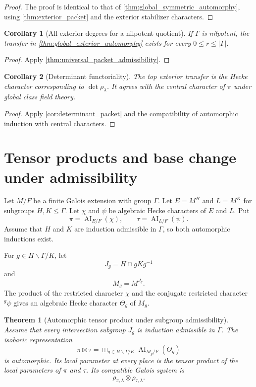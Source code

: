 \documentclass{aomart}
\newtheorem{theorem}{Theorem}[section]
\newtheorem{corollary}[corollary]{Corollary}
\theoremstyle{definition}
\theoremstyle{remark}
\newcommand{\AI}{\operatorname{AI}}
\newcommand{\abs}[1]{\left\lvert#1\right\rvert}
\newcommand{\boxplusop}{\mathbin{\boxplus}}
\begin{document}
\begin{proof}
The proof is identical to that of \cref{thm:global_symmetric_automorphy}, using \cref{thm:exterior_packet} and the exterior stabilizer characters.
\end{proof}

\begin{corollary}[All exterior degrees for a nilpotent quotient]\label{cor:nilpotent_all_exterior}
If \(\Gamma\) is nilpotent, the transfer in \cref{thm:global_exterior_automorphy} exists for every \(0\leq r\leq\abs\Gamma\).
\end{corollary}

\begin{proof}
Apply \cref{thm:universal_packet_admissibility}.
\end{proof}

\begin{corollary}[Determinant functoriality]\label{cor:global_determinant}
The top exterior transfer is the Hecke character corresponding to \(\det\rho_\lambda\). It agrees with the central character of \(\pi\) under global class field theory.
\end{corollary}

\begin{proof}
Apply \cref{cor:determinant_packet} and the compatibility of automorphic induction with central characters.
\end{proof}

\section{Tensor products and base change under admissibility}\label{sec:global_tensor}

Let \(M/F\) be a finite Galois extension with group \(\Gamma\). Let \(E=M^H\) and \(L=M^K\) for subgroups \(H,K\leq\Gamma\). Let \(\chi\) and \(\psi\) be algebraic Hecke characters of \(E\) and \(L\). Put
\[
\pi=\AI_{E/F}(\chi),
\qquad
\tau=\AI_{L/F}(\psi).
\]
Assume that \(H\) and \(K\) are induction admissible in \(\Gamma\), so both automorphic inductions exist.

For \(g\in H\backslash\Gamma/K\), let
\[
J_g=H\cap gKg^{-1}
\]
and
\[
M_g=M^{J_g}.
\]
The product of the restricted character \(\chi\) and the conjugate restricted character \({}^g\psi\) gives an algebraic Hecke character \(\Theta_g\) of \(M_g\).

\begin{theorem}[Automorphic tensor product under subgroup admissibility]\label{thm:global_tensor_product}
Assume that every intersection subgroup \(J_g\) is induction admissible in \(\Gamma\). The isobaric representation
\[
\boxed{
\pi\boxtimes\tau
=
\boxplusop_{g\in H\backslash\Gamma/K}
\AI_{M_g/F}(\Theta_g)
}
\]
is automorphic. Its local parameter at every place is the tensor product of the local parameters of \(\pi\) and \(\tau\). Its compatible Galois system is
\[
\rho_{\pi,\lambda}\otimes\rho_{\tau,\lambda}.
\]
\end{theorem}
\end{document}
